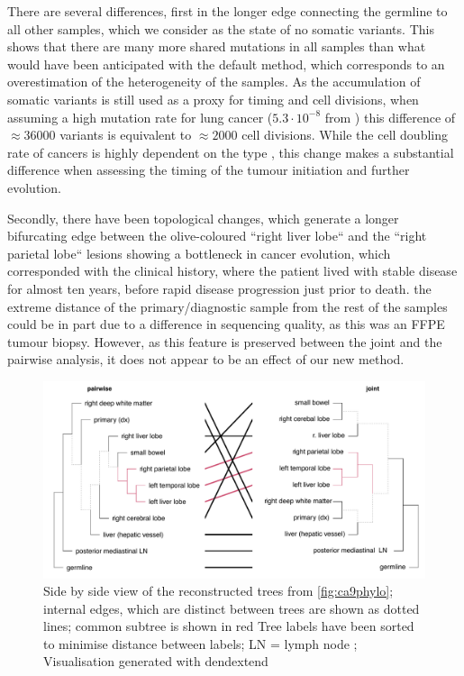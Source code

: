 There are several  differences, first in the longer edge connecting the germline to all other samples, which we consider as the state of no somatic variants. This shows that there are many more shared mutations in all samples than what would have been anticipated with the default method, which corresponds to an overestimation of the heterogeneity of the samples. As the accumulation of somatic variants is still used as a proxy for timing and cell divisions, when assuming a high mutation rate for lung cancer ($5.3 \cdot 10^{-8}$ from \citeauthor*{Werner2020} \cite{Werner2020}) this difference of $\approx 36000$ variants is equivalent to $\approx 2000$ cell divisions. While the cell doubling rate of cancers is highly dependent on the type \cite{Arai1994}, this change makes a substantial difference when assessing the timing of the tumour initiation and further evolution. 

Secondly, there have been topological changes, which generate a longer bifurcating edge between the olive-coloured ``right liver lobe`` and the ``right parietal lobe`` lesions showing a bottleneck in cancer evolution, which corresponded with the clinical history, where the patient lived with stable disease for almost ten years, before rapid disease progression just prior to death.  the extreme distance of the primary/diagnostic sample from the rest of the samples could be in part due to a difference in sequencing quality, as this was an FFPE tumour biopsy. However, as this feature is preserved between  the joint and the pairwise analysis, it does not appear to be an effect of our new method.

\begin{figure}[ht]
\centering
\includegraphics[width=.99\linewidth]{Figures/jointVariantCalling/tanglePhyloCA9.pdf}
\caption[Tanglegram of the reconstructed phylogenies]{Side by side view of the reconstructed trees from \autoref{fig:ca9phylo}; internal edges, which are distinct between trees are shown as dotted lines; common subtree is shown in red  Tree labels have been sorted to minimise distance between labels; LN = lymph node ; Visualisation generated with dendextend \cite{Galili2015}}\label{fig:tanglePhyloCA9}
\end{figure}

